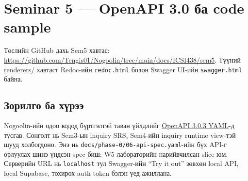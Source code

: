 \documentclass[
  mongolian,
]{article}
\author{}
\date{}
\begin{document}


\section{Seminar 5 --- OpenAPI 3.0 ба code
sample}\label{seminar-5-openapi-3.0-ux431ux430-code-sample}

Төслийн GitHub дахь Sem5 хавтас:
\url{https://github.com/Tengis01/Nogoolin/tree/main/docs/ICSI438/sem5}.
Түүний \url{renderers/} хавтаст Redoc-ийн \texttt{redoc.html} болон
Swagger UI-ийн \texttt{swagger.html} байна.

\subsection{Зорилго ба
хүрээ}\label{ux437ux43eux440ux438ux43bux433ux43e-ux431ux430-ux445ux4afux440ux44dux44d}

Nogoolin-ийн одоо кодод бүртгэлтэй таван үйлдлийг
\href{openapi/openapi.yaml}{OpenAPI 3.0.3 YAML}-д тусгав. Сонголт нь
Sem3-ын inquiry SRS, Sem4-ийн inquiry runtime view-тэй шууд холбогдоно.
Энэ нь \texttt{docs/phase-0/06-api-spec.yaml}-ийн бүх API-г орлуулах
шинэ үндсэн spec биш; W5 лабораторийн нарийвчилсан slice юм. Серверийн
URL нь \texttt{localhost} тул Swagger-ийн ``Try it out'' зөвхөн local
API, local Supabase, тохирох auth token бэлэн үед ажиллана.
\end{document}
